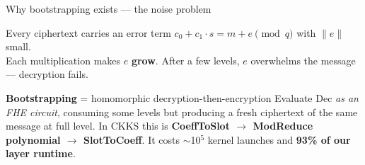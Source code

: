 \documentclass[aspectratio=169]{beamer}
\begin{document}
\begin{frame}{Why bootstrapping exists — the noise problem}
  \begin{block}{Every ciphertext carries an error term}
    \footnotesize
    $c_0 + c_1 \cdot s = m + e \pmod{q}$ \quad with $\|e\|$ small.
    \\
    Each multiplication makes $e$ \textbf{grow}. After a few levels, $e$
    overwhelms the message — decryption fails.
  \end{block}
  \pause
  \begin{center}
  \end{center}
  \vspace{0.2em}
  \begin{block}{\textbf{Bootstrapping} = homomorphic decryption-then-encryption}
    \footnotesize
    Evaluate $\mathrm{Dec}$ \emph{as an FHE circuit}, consuming some levels but
    producing a fresh ciphertext of the same message at full level. In CKKS this is
    \textbf{CoeffToSlot $\to$ ModReduce polynomial $\to$ SlotToCoeff}. It costs
    $\sim$10$^5$ kernel launches and \textbf{93\% of our layer runtime}.
  \end{block}
\end{frame}
\end{document}
